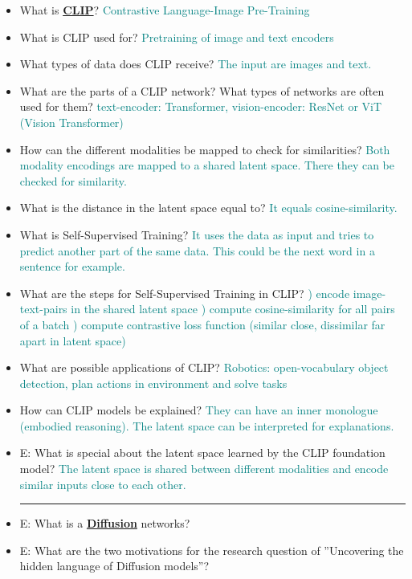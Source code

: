 \documentclass{report}
\newcommand{\asw}[2][teal]{}
\renewcommand{\asw}[2][teal]{\textcolor{#1}{#2}}
\begin{document}
\begin{itemize}
		\item What is \textbf{\underline{CLIP}}?
		\asw{\newline Contrastive Language-Image Pre-Training}
		\item What is CLIP used for?
		\asw{\newline Pretraining of image and text encoders}
		\item What types of data does CLIP receive?
		\asw{\newline The input are images and text.}
		\item What are the parts of a CLIP network? What types of networks are often used for them?
		\asw{\newline text-encoder: Transformer, vision-encoder: ResNet or ViT (Vision Transformer)}
		\item How can the different modalities be mapped to check for similarities?
		\asw{\newline Both modality encodings are mapped to a shared latent space. There they can be checked for similarity.}
		\item What is the distance in the latent space equal to?
		\asw{\newline It equals cosine-similarity.}
		\item What is Self-Supervised Training?
		\asw{\newline It uses the data as input and tries to predict another part of the same data. This could be the next word in a sentence for example.}
		\item What are the steps for Self-Supervised Training in CLIP?
		\asw{) encode image-text-pairs in the shared latent space
			\newline 2) compute cosine-similarity for all pairs of a batch
			\newline 3) compute contrastive loss function (similar close, dissimilar far apart in latent space)}
		\item What are possible applications of CLIP?
		\asw{\newline Robotics: open-vocabulary object detection, plan actions in environment and solve tasks}
		\item How can CLIP models be explained?
		\asw{\newline They can have an inner monologue (embodied reasoning). The latent space can be interpreted for explanations.}
		\item E: What is special about the latent space learned by the CLIP foundation model?
		\asw{\newline The latent space is shared between different modalities and encode similar inputs close to each other.}
		\newline
		\hrule 
		
		\item E: What is a \textbf{\underline{Diffusion}} networks?
		\asw{\newline }
		\item E: What are the two motivations for the research question of ”Uncovering the hidden language of Diffusion models”?
		\asw{\newline }
		
	\end{itemize}
\end{document}
